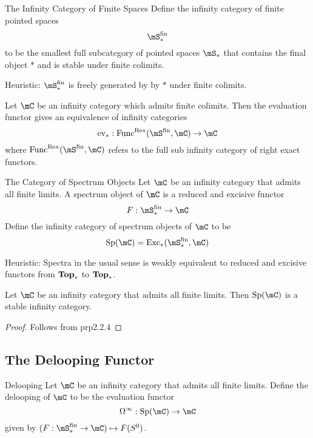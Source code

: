 \documentclass[a4paper]{article}
\begin{document}
\begin{defn}{The Infinity Category of Finite Spaces}{} Define the infinity category of finite pointed spaces $$\mS_\ast^\text{fin}$$ to be the smallest full subcategory of pointed spaces $\mS_\ast$ that contains the final object $\ast$ and is stable under finite colimits. 
\end{defn}

Heuristic: $\mS_\ast^\text{fin}$ is freely generated by by $\ast$ under finite colimits. 

\begin{lmm}{}{} Let $\mC$ be an infinity category which admits finite colimits. Then the evaluation functor gives an equivalence of infinity categories $$\text{ev}_\ast:\text{Func}^\text{Rex}(\mS^\text{fin},\mC)\to\mC$$ where $\text{Func}^\text{Rex}(\mS^\text{fin},\mC)$ refers to the full sub infinity category of right exact functors. 
\end{lmm}

\begin{defn}{The Category of Spectrum Objects}{} Let $\mC$ be an infinity category that admits all finite limits. A spectrum object of $\mC$ is a reduced and excisive functor $$F:\mS_\ast^\text{fin}\to\mC$$ Define the infinity category of spectrum objects of $\mC$ to be $$\text{Sp}(\mC)=\text{Exc}_\ast(\mS_\ast^\text{fin},\mC)$$
\end{defn}

Heuristic: Spectra in the usual sense is weakly equivalent to reduced and excisive functors from $\bold{Top}_\ast$ to $\bold{Top}_\ast$. 

\begin{lmm}{}{} Let $\mC$ be an infinity category that admits all finite limits. Then $\text{Sp}(\mC)$ is a stable infinity category. \tcbline
\begin{proof}
Follows from prp2.2.4
\end{proof}
\end{lmm}

\subsection{The Delooping Functor}
\begin{defn}{Delooping}{} Let $\mC$ be an infinity category that admits all finite limits. Define the delooping of $\mC$ to be the evaluation functor $$\Omega^\infty:\text{Sp}(\mC)\to\mC$$ given by $(F:\mS_\ast^\text{fin}\to\mC)\mapsto F(S^0)$. 
\end{defn}
\end{document}
